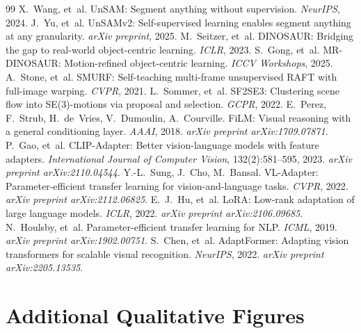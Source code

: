 \documentclass{article}
\begin{document}
\begin{thebibliography}{99}
 X.~Wang, et~al. UnSAM: Segment anything without supervision. \emph{NeurIPS}, 2024.
 J.~Yu, et~al. UnSAMv2: Self-supervised learning enables segment anything at any granularity. \emph{arXiv preprint}, 2025.
 M.~Seitzer, et~al. DINOSAUR: Bridging the gap to real-world object-centric learning. \emph{ICLR}, 2023.
 S.~Gong, et~al. MR-DINOSAUR: Motion-refined object-centric learning. \emph{ICCV Workshops}, 2025.
 A.~Stone, et~al. SMURF: Self-teaching multi-frame unsupervised RAFT with full-image warping. \emph{CVPR}, 2021.
 L.~Sommer, et~al. SF2SE3: Clustering scene flow into SE(3)-motions via proposal and selection. \emph{GCPR}, 2022.
 E.~Perez, F.~Strub, H.~de~Vries, V.~Dumoulin, A.~Courville. FiLM: Visual reasoning with a general conditioning layer. \emph{AAAI}, 2018. \emph{arXiv preprint arXiv:1709.07871}.
 P.~Gao, et~al. CLIP-Adapter: Better vision-language models with feature adapters. \emph{International Journal of Computer Vision}, 132(2):581--595, 2023. \emph{arXiv preprint arXiv:2110.04544}.
 Y.-L.~Sung, J.~Cho, M.~Bansal. VL-Adapter: Parameter-efficient transfer learning for vision-and-language tasks. \emph{CVPR}, 2022. \emph{arXiv preprint arXiv:2112.06825}.
 E.~J.~Hu, et~al. LoRA: Low-rank adaptation of large language models. \emph{ICLR}, 2022. \emph{arXiv preprint arXiv:2106.09685}.
 N.~Houlsby, et~al. Parameter-efficient transfer learning for NLP. \emph{ICML}, 2019. \emph{arXiv preprint arXiv:1902.00751}.
 S.~Chen, et~al. AdaptFormer: Adapting vision transformers for scalable visual recognition. \emph{NeurIPS}, 2022. \emph{arXiv preprint arXiv:2205.13535}.
\end{thebibliography}

\clearpage
\appendix
\renewcommand{\thefigure}{\Alph{section}.\arabic{figure}}
\renewcommand{\thetable}{\Alph{section}.\arabic{table}}

\section{Additional Qualitative Figures}
\label{sec:supp:qualitative}
\end{document}

